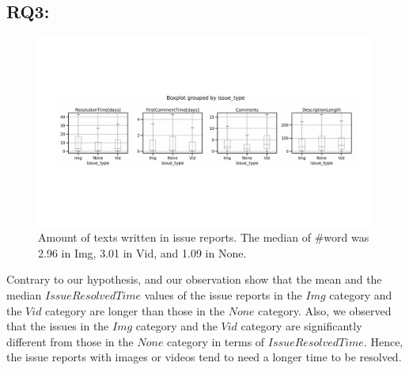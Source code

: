 \subsection*{RQ3: \RQthree{}}
\begin{figure}[t]
    \centering
    \includegraphics[width=0.5\linewidth]{./figures/fixes.pdf}
    \caption{Amount of texts written in issue reports. 
    The median of \#word was 2.96 in Img, 3.01 in Vid, and 1.09 in None.
    }
    \label{fig:resolvedtime}
\end{figure}

Contrary to our hypothesis,  and our observation show that 
the mean and the median $IssueResolvedTime$ values of 
the issue reports in the $Img$ category and the $Vid$ category are 
longer than those in the $None$ category. 
Also, we observed that the issues in the $Img$ category and 
the $Vid$ category are significantly different from those 
in the $None$ category in terms of $IssueResolvedTime$.
Hence, the issue reports with images or videos tend to need 
a longer time to be resolved. 


